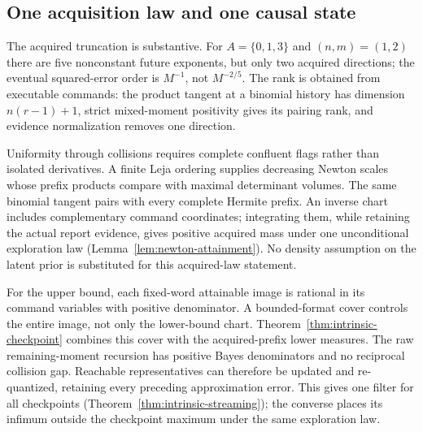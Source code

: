 \subsection{One acquisition law and one causal state}
\label{sec:contribution-v23}\label{sec:proof-route-v24}
The acquired truncation is substantive. For $A=\{0,1,3\}$ and
$(n,m)=(1,2)$ there are five nonconstant future exponents, but only
two acquired directions; the eventual squared-error order is $M^{-1}$,
not $M^{-2/5}$. The rank is obtained from executable commands: the
product tangent at a binomial history has dimension $n(r-1)+1$,
strict mixed-moment positivity gives its pairing rank, and evidence
normalization removes one direction.

Uniformity through collisions requires complete confluent flags rather
than isolated derivatives. A finite Leja ordering supplies decreasing
Newton scales whose prefix products compare with maximal determinant
volumes. The same binomial tangent pairs with every complete Hermite
prefix. An inverse chart includes complementary command coordinates;
integrating them, while retaining the actual report evidence, gives
positive acquired mass under one unconditional exploration law
(Lemma~\ref{lem:newton-attainment}). No density assumption on the
latent prior is substituted for this acquired-law statement.

For the upper bound, each fixed-word attainable image is rational in
its command variables with positive denominator. A bounded-format
cover controls the entire image, not only the lower-bound chart.
Theorem~\ref{thm:intrinsic-checkpoint} combines this cover with the
acquired-prefix lower measures. The raw remaining-moment recursion
has positive Bayes denominators and no reciprocal collision gap.
Reachable representatives can therefore be updated and re-quantized,
retaining every preceding approximation error. This gives one filter
for all checkpoints (Theorem~\ref{thm:intrinsic-streaming}); the
converse places its infimum outside the checkpoint maximum under the
same exploration law.


